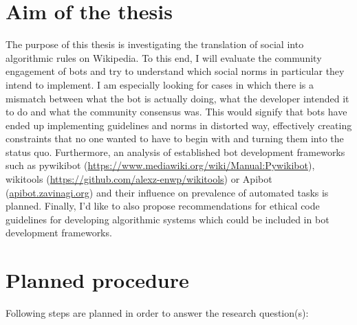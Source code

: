 \documentclass[pdftex,a4paper,11pt]{scrartcl}
\begin{document}
\section{Aim of the thesis}
The purpose of this thesis is investigating the translation of social into algorithmic rules on Wikipedia.
To this end, I will evaluate the community engagement of bots and try to understand which social norms in particular they intend to implement.
I am especially looking for cases in which there is a mismatch between what the bot is actually doing, what the developer intended it to do and what the community consensus was.
This would signify that bots have ended up implementing guidelines and norms in distorted way, effectively creating constraints that no one wanted to have to begin with and turning them into the status quo.
Furthermore, an analysis of established bot development frameworks such as pywikibot (\url{https://www.mediawiki.org/wiki/Manual:Pywikibot}), wikitools (\url{https://github.com/alexz-enwp/wikitools}) or Apibot (\url{apibot.zavinagi.org}) and their influence on prevalence of automated tasks is planned.
Finally, I'd like to also propose recommendations for ethical code guidelines for developing algorithmic systems which could be included in bot development frameworks.

\section{Planned procedure}

Following steps are planned in order to answer the research question(s):
\end{document}
